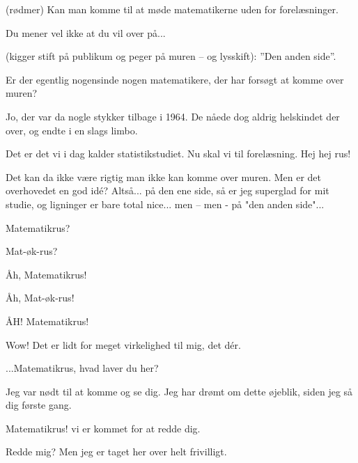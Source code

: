 \documentclass[a4paper,11pt]{article}
\begin{document}
\begin{sketch}
 (rødmer) Kan man komme til at møde matematikerne uden for forelæsninger.

 Du mener vel ikke at du vil over på...

 (kigger stift på publikum og peger på muren -- og lysskift): ''Den anden side''.


 Er der egentlig nogensinde nogen matematikere, der har forsøgt at komme over muren?

 Jo, der var da nogle stykker tilbage i 1964. De nåede dog aldrig helskindet der over, og endte i en slags limbo.

 Det er det vi i dag kalder statistikstudiet. Nu skal vi til forelæsning. Hej hej rus!


 Det kan da ikke være rigtig man ikke kan komme over muren. Men er det overhovedet en god idé? Altså... på den ene side, så er jeg superglad for mit studie, og ligninger er bare total nice... men -- men - på "den anden side"...


 Matematikrus?

 Mat-øk-rus?

 Åh, Matematikrus!

 Åh, Mat-øk-rus!


 ÅH! Matematikrus!


 Wow! Det er lidt for meget virkelighed til mig, det dér.

 ...Matematikrus, hvad laver du her?

 Jeg var nødt til at komme og se dig. Jeg har drømt om dette øjeblik, siden jeg så dig første gang.


 Matematikrus! vi er kommet for at redde dig.

 Redde mig? Men jeg er taget her over helt frivilligt.


\end{sketch}
\end{document}
